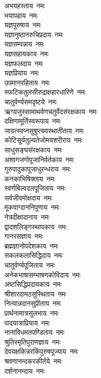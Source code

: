 \begin{flushleft}
अभयहस्ताय~नमः\\
भयापहाय~नमः\\
यज्ञपुरुषाय~नमः\hfill{}\\
यज्ञानुष्ठानरुचिप्रदाय~नमः\\
यज्ञसम्पन्नाय~नमः\\
यज्ञसहायकाय~नमः\\
यज्ञफलदाय~नमः\\
यज्ञप्रियाय~नमः\\
उपमानरहिताय~नमः\\
स्फटिकतुलसीरुद्राक्षहारधारिणे~नमः\\
चातुर्वर्ण्यसमदृष्टये~नमः\\
ऋग्य़जुस्सामाथर्वणचतुर्वेदसंरक्षकाय~नमः\\
दक्षिणामूर्तिस्वरूपाय~नमः\hfill{}\\
जाग्रत्स्वप्नसुषुप्त्यवस्थातीताय~नमः\\
कोटिसूर्यतुल्यतेजोमयशरीराय~नमः\\
साधुसङ्घसंरक्षकाय~नमः\\
अश्वगजगोपूजानिर्वर्तकाय~नमः\\
गुरुपादुकापूजाधुरन्धराय~नमः\\
कनकाभिषिक्ताय~नमः\\
स्वर्णबिल्वदलपूजिताय~नमः\\
सर्वजीवमोक्षदाय~नमः\\
मूकवाग्दाननिपुणाय~नमः\\
नेत्रदीक्षादानाय~नमः\hfill{}\\
द्वादशलिङ्गस्थापकाय~नमः\\
गानरसज्ञाय~नमः\\
ब्रह्मज्ञानोपदेशकाय~नमः\\
सकलकलासिद्धिदाय~नमः\\
चातुर्वर्ण्यपूजिताय~नमः\\
अनेकभाषासम्भाषणकोविदाय~नमः\\
अष्टसिद्धिप्रदायकाय~नमः\\
श्रीशारदामठसुस्थिताय~नमः\\
नित्यान्नदानसुप्रीताय~नमः\\
प्रार्थनामात्रसुलभाय~नमः\hfill{}\\
पादयात्राप्रियाय~नमः\\
नानाविधमतपण्डिताय~नमः\\
श्रुतिस्मृतिपुराणज्ञाय~नमः\\
देवयक्षकिन्नरकिंपुरुषपूज्याय~नमः\\
श्रवणानन्दकरकीर्तये~नमः\\
दर्शनानन्दाय~नमः\\

\end{flushleft}
